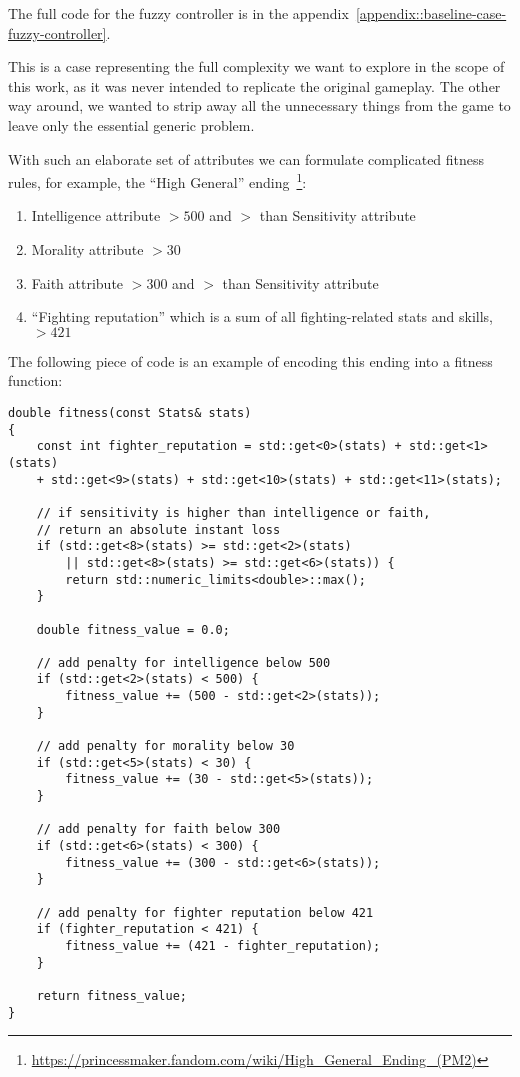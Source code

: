 \documentclass[12pt, a4paper]{report}
\begin{document}
	The full code for the fuzzy controller is in the appendix~\ref{appendix::baseline-case-fuzzy-controller}.

	This is a case representing the full complexity we want to explore in the scope of this work, as it was never intended to replicate the original gameplay.
	The other way around, we wanted to strip away all the unnecessary things from the game to leave only the essential generic problem.
	
	With such an elaborate set of attributes we can formulate complicated fitness rules, for example, the ``High General'' ending~\footnote{\url{https://princessmaker.fandom.com/wiki/High_General_Ending_(PM2)}}:
	
	\begin{enumerate}
		\item Intelligence attribute $> 500$ and $>$ than Sensitivity attribute
		\item Morality attribute $> 30$
		\item Faith attribute $> 300$ and $>$ than Sensitivity attribute
		\item ``Fighting reputation'' which is a sum of all fighting-related stats and skills, $> 421$
	\end{enumerate}
	
The following piece of code is an example of encoding this ending into a fitness function:

\begin{lstlisting}[label=fitness-general]
double fitness(const Stats& stats)
{
	const int fighter_reputation = std::get<0>(stats) + std::get<1>(stats)
	+ std::get<9>(stats) + std::get<10>(stats) + std::get<11>(stats);
	
	// if sensitivity is higher than intelligence or faith,
	// return an absolute instant loss
	if (std::get<8>(stats) >= std::get<2>(stats) 
		|| std::get<8>(stats) >= std::get<6>(stats)) {
		return std::numeric_limits<double>::max();
	}
	
	double fitness_value = 0.0;
	
	// add penalty for intelligence below 500
	if (std::get<2>(stats) < 500) {
		fitness_value += (500 - std::get<2>(stats));
	}
	
	// add penalty for morality below 30
	if (std::get<5>(stats) < 30) {
		fitness_value += (30 - std::get<5>(stats));
	}
	
	// add penalty for faith below 300
	if (std::get<6>(stats) < 300) {
		fitness_value += (300 - std::get<6>(stats));
	}
	
	// add penalty for fighter reputation below 421
	if (fighter_reputation < 421) {
		fitness_value += (421 - fighter_reputation);
	}
	
	return fitness_value;
}
\end{lstlisting}	
\end{document}
